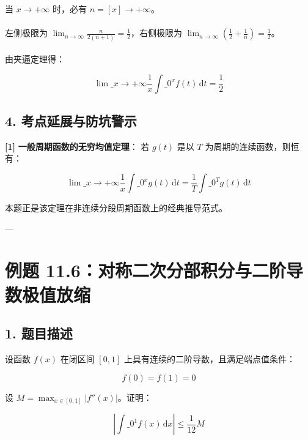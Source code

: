 \documentclass[11pt,a4paper,UTF8]{ctexart}
\begin{document}
\begin{solbox}[分步推导与答题规范]
当 $x \to +\infty$ 时，必有 $n = [x] \to +\infty$。\\ \\
左侧极限为 $\lim_{n\to\infty} \frac{n}{2(n+1)} = \frac{1}{2}$，右侧极限为 $\lim_{n\to\infty} \left(\frac{1}{2} + \frac{1}{n}\right) = \frac{1}{2}$。\\ \\
由夹逼定理得：

\begin{equation*}
\lim\_{x \to +\infty} \frac{1}{x} \int\_0^x f(t)\,\mathrm{d}t = \frac{1}{2}
\end{equation*}

\end{solbox}


\subsection{4. 考点延展与防坑警示}
\begin{solbox}[分步推导与答题规范]
\textbf{[1]}  \textbf{一般周期函数的无穷均值定理}：
若 $g(t)$ 是以 $T$ 为周期的连续函数，则恒有：

\begin{equation*}
\lim\_{x \to +\infty} \frac{1}{x}\int\_0^x g(t)\,\mathrm{d}t = \frac{1}{T}\int\_0^T g(t)\,\mathrm{d}t
\end{equation*}

本题正是该定理在非连续分段周期函数上的经典推导范式。
\end{solbox}

---


\section{例题 11.6：对称二次分部积分与二阶导数极值放缩}


\subsection{1. 题目描述}
设函数 $f(x)$ 在闭区间 $[0, 1]$ 上具有连续的二阶导数，且满足端点值条件：

\begin{equation*}
f(0) = f(1) = 0
\end{equation*}

设 $M = \max_{x \in [0, 1]} |f''(x)|$。证明：

\begin{equation*}
\left| \int\_0^1 f(x)\,\mathrm{d}x \right| \le \frac{1}{12} M
\end{equation*}
\end{document}
